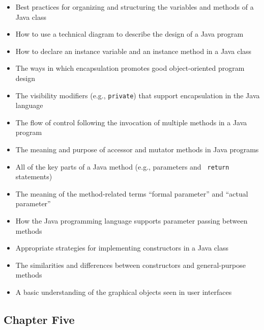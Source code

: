 \documentclass[11pt]{article}
\begin{document}
\begin{itemize}

  \itemsep 0in

  \item Best practices for organizing and structuring the variables and methods
    of a Java class

  \item How to use a technical diagram to describe the design of a Java program

  \item How to declare an instance variable and an instance method in a Java
    class

  \item The ways in which encapsulation promotes good object-oriented program
    design

  \item The visibility modifiers (e.g., {\tt private}) that support
    encapsulation in the Java language

  \item The flow of control following the invocation of multiple methods in a
    Java program

  \item The meaning and purpose of accessor and mutator methods in Java programs

  \item All of the key parts of a Java method (e.g., parameters and {\tt
    return} statements)

  \item The meaning of the method-related terms ``formal parameter'' and
    ``actual parameter''

  \item How the Java programming language supports parameter passing between
    methods

  \item Appropriate strategies for implementing constructors in a Java class

  \item The similarities and differences between constructors and
    general-purpose methods

  \item A basic understanding of the graphical objects seen in user interfaces

\end{itemize}

\subsection*{Chapter Five}
\end{document}
